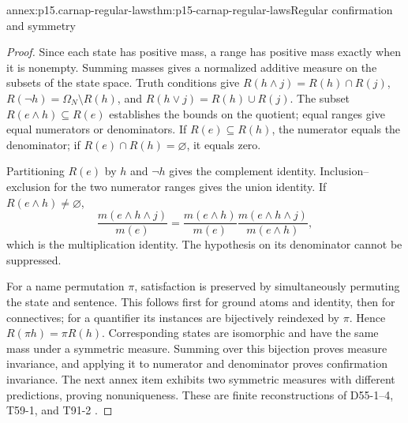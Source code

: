 \begin{annexitem}{annex:p15.carnap-regular-laws}{thm:p15-carnap-regular-laws}{Regular confirmation and symmetry}
\begin{proof}
Since each state has positive mass, a range has positive mass exactly when
it is nonempty. Summing masses gives a normalized additive measure on
the subsets of the state space. Truth conditions give
\(R(h\land j)=R(h)\cap R(j)\),
\(R(\neg h)=\Omega_N\setminus R(h)\), and
\(R(h\lor j)=R(h)\cup R(j)\). The subset
\(R(e\land h)\subseteq R(e)\) establishes the bounds on the
quotient; equal ranges give equal numerators or denominators. If
\(R(e)\subseteq R(h)\), the numerator equals the denominator;
if \(R(e)\cap R(h)=\varnothing\), it equals zero.

Partitioning \(R(e)\) by \(h\) and \(\neg h\) gives the
complement identity. Inclusion--exclusion for the two numerator ranges
gives the union identity. If \(R(e\land h)\ne\varnothing\),
\[
 \frac{m(e\land h\land j)}{m(e)}
 =\frac{m(e\land h)}{m(e)}
   \frac{m(e\land h\land j)}{m(e\land h)},
\]
which is the multiplication identity. The hypothesis on its denominator
cannot be suppressed.

For a name permutation \(\pi\), satisfaction is preserved by
simultaneously permuting the state and sentence. This follows first for
ground atoms and identity, then for connectives; for a quantifier its
instances are bijectively reindexed by \(\pi\). Hence
\(R(\pi h)=\pi R(h)\). Corresponding states are isomorphic and
have the same mass under a symmetric measure. Summing over this bijection
proves measure invariance, and applying it to numerator and denominator
proves confirmation invariance. The next annex item exhibits two
symmetric measures with different predictions, proving nonuniqueness.
These are finite reconstructions of D55-1--4, T59-1, and T91-2
\cite{Carnap1950Probability}.
\end{proof}
\end{annexitem}


